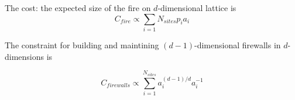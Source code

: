 The cost: the expected size of the fire on $d$-dimensional lattice is
\[
  C_{fire}  \propto
  \sum_{i=1}{N_{sites}}
    p_i a_i
\]

The constraint for building and maintining $(d - 1)$-dimensional firewalls in $d$-dimensions is

\[
  C_{firewalls} \propto
  \sum_{i=1}^{N_{sites}}
    a_i^{
      (d - 1)/d
    }
    a_i^{-1}
\]